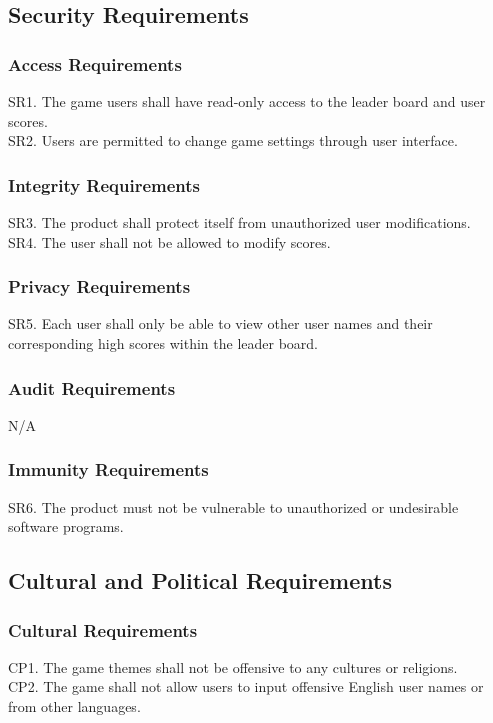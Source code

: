 \documentclass[12pt]{article}
\begin{document}
\subsection{Security Requirements}
    \subsubsection{Access Requirements}
    SR1. The game users shall have read-only access to the leader board and user scores. \\
    SR2. Users are permitted to change game settings through user interface.
    
    \subsubsection{Integrity Requirements}
    SR3. The product shall protect itself from unauthorized user modifications.\\
    SR4. The user shall not be allowed to modify scores.
    
    \subsubsection{Privacy Requirements}
    SR5. Each user shall only be able to view other user names and their corresponding high scores within the leader board.
    
    \subsubsection{Audit Requirements}
    N/A
    
    \subsubsection{Immunity Requirements}
    SR6. The product must not be vulnerable to unauthorized or undesirable software programs.
    
\subsection{Cultural and Political Requirements}
    \subsubsection{Cultural Requirements}
    CP1. The game themes shall not be offensive to any cultures or religions. \\
    CP2. The game shall not allow users to input offensive English user names or from other languages.
\end{document}

